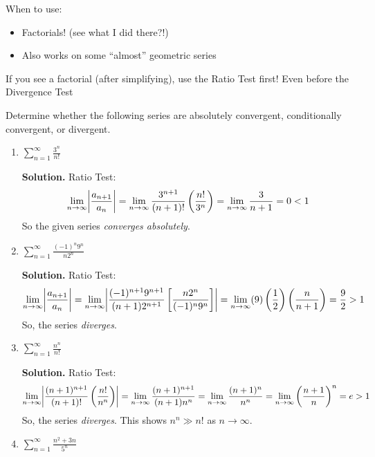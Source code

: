 \begin{Remark}{}{}
    When to use:
    \begin{itemize}
        \item Factorials! (see what I did there?!)
        \item Also works on some ``almost'' geometric series
    \end{itemize}
    If you see a factorial (after simplifying), use the Ratio Test first! Even
    before the Divergence Test
\end{Remark}

\begin{Example}{}{}
    Determine whether the following series are absolutely convergent,
    conditionally convergent, or divergent.
    \begin{enumerate}[label=(\roman*)]
        \item $ \displaystyle \sum\limits_{n=1}^{\infty} \frac{3^n}{n!} $

              \textbf{Solution.} Ratio Test:
              \[ \lim\limits_{{n} \to {\infty}} \abs*{\frac{a_{n+1}}{a_n}}=
                  \lim\limits_{{n} \to {\infty}} \frac{3^{n+1}}{(n+1)!}\left( \frac{n!}{3^n} \right)
                  =\lim\limits_{{n} \to {\infty}} \frac{3}{n+1}=0<1 \]
              So the given series \emph{converges absolutely}.
        \item $ \displaystyle \sum\limits_{n=1}^{\infty} \frac{(-1)^n9^n}{n2^n} $

              \textbf{Solution.} Ratio Test:
              \[ \lim\limits_{{n} \to {\infty}} \abs*{\frac{a_{n+1}}{a_n}}=
                  \lim\limits_{{n} \to {\infty}}
                  \abs*{\frac{(-1)^{n+1}9^{n+1}}{(n+1)2^{n+1}}
                  \left[ \frac{n2^n}{(-1)^n9^n} \right]}
                  =\lim\limits_{{n} \to {\infty}} (9)\left( \frac{1}{2} \right)
                  \left( \frac{n}{n+1} \right)
                  =\frac{9}{2} >1 \]
              So, the series \emph{diverges}.
        \item $ \displaystyle \sum\limits_{n=1}^{\infty}\frac{n^n}{n!} $

              \textbf{Solution.} Ratio Test:
              \[ \lim\limits_{{n} \to {\infty}} \abs*{\frac{(n+1)^{n+1}}{(n+1)!}
                      \left( \frac{n!}{n^n} \right)}
                  =\lim\limits_{{n} \to {\infty}} \frac{(n+1)^{n+1}}{(n+1)n^n}
                  =\lim\limits_{{n} \to {\infty}} \frac{(n+1)^n}{n^n}
                  =\lim\limits_{{n} \to {\infty}} \left( \frac{n+1}{n}  \right)^n=e>1  \]
              So, the series \emph{diverges}. This shows $ n^n\gg n! $ as $ n\to\infty $.
        \item $ \displaystyle \sum\limits_{n=1}^{\infty} \frac{n^2+3n}{5^n}  $


\end{enumerate}
\end{Example}
